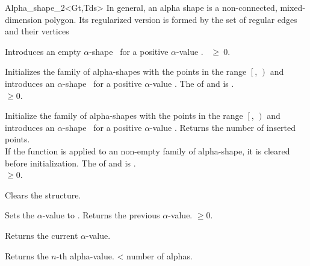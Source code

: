 \begin{ccClassTemplate} {Alpha_shape_2<Gt,Tds>}
{ In general, an alpha shape is a non-connected, mixed-dimension
polygon. Its regularized version is formed by the set of regular edges
and their vertices}

\ccCreation
{}

{Introduces an empty $\alpha$-shape \ccVar\ for a positive $\alpha$-value
 .
\ccPrecond {}~$\geq~0$.}


{Initializes the family of alpha-shapes with the points in the range
$\left[\right.$, $\left.\right)$ and 
introduces an $\alpha$-shape \ccVar\ for a positive $\alpha$-value
.  
\ccPrecond The  of  and
 is .\\
 $\geq 0$.}

\ccOperations

{Initialize the family of alpha-shapes with the points in the range
$\left[\right.$, $\left.\right)$ and 
introduces an $\alpha$-shape \ccVar\ for a positive $\alpha$-value
. Returns the number of inserted points. \\
If the function is applied to an non-empty family of alpha-shape, it is cleared
before initialization.
\ccPrecond The  of  and
 is .\\
 $\geq 0$.}

{Clears the structure.}

{Sets the $\alpha$-value to .
 Returns the previous $\alpha$-value.
\ccPrecond {} $\geq 0$.}

{Returns the current $\alpha$-value.}

{Returns the $n$-th alpha-value.
 \ccPrecond {} < number of alphas.}


\end{ccClassTemplate}

